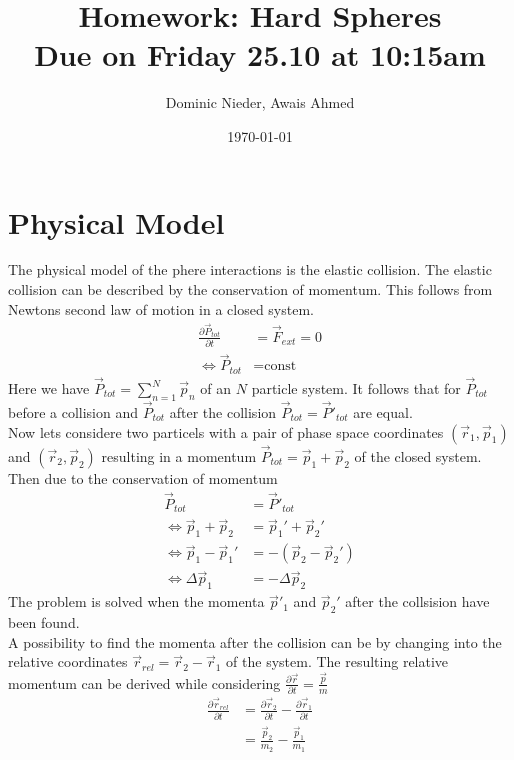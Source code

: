 \documentclass{article}
\title{
    \vspace{2in}
    \textmd{\textbf{Homework: Hard Spheres}}\\
    \normalsize\vspace{0.1in}\small{Due on Friday 25.10 at 10:15am}\\
    \vspace{0.1in}
    \vspace{3in}
}
\author{Dominic Nieder, Awais Ahmed}
\date{\today}
\begin{document}
\maketitle

\newpage

\section{Physical Model}
    The physical model of the phere interactions is the elastic collision. The elastic collision can be described by the conservation of momentum. This follows from Newtons second law of motion in a closed system.
    \begin{align*}
        \frac{\partial \vec{P}_{tot}}{\partial t} &= \vec{F}_{ext}=0  \\
        \Leftrightarrow \vec{P}_{tot}&=\text{const} 
    \end{align*}
    Here we have $\vec{P}_{tot}=\sum_{n=1}^{N}\vec{p}_n$ of an $N$ particle system. It follows that for $\vec{P}_{tot}$ before a collision and $\vec{P}_{tot}$ after the collision $\vec{P}_{tot}=\vec{P}'_{tot}$ are equal. \\
    Now lets considere two particels with a pair of phase space coordinates $(\vec{r}_1, \vec{p}_1)$ and $(\vec{r}_2, \vec{p}_2)$ resulting in a momentum $\vec{P}_{tot}=\vec{p}_1+\vec{p}_2$ of the closed system. Then due to the conservation of momentum 
    \begin{align*}
        \vec{P}_{tot}&=\vec{P}'_{tot} \\
        \Leftrightarrow \vec{p}_1+\vec{p}_2&= \vec{p}_1'+\vec{p}_2' \\
        \Leftrightarrow \vec{p}_1 - \vec{p}_1' &= - (\vec{p}_2 - \vec{p}_2') \\
        \Leftrightarrow \Delta \vec{p}_1 &= -\Delta\vec{p}_2
    \end{align*}
    The problem is solved when the momenta $\vec{p}'_1$ and $\vec{p}_2'$ after the collsision have been found.\\ %
    A possibility to find the momenta after the collision can be by changing into the relative coordinates $\vec{r}_{rel}=\vec{r}_2-\vec{r}_1$ of the system. 
    The resulting relative momentum can be derived while considering $\frac{\partial \vec{r}}{\partial t}=\frac{\vec{p}}{m}$ 
    \begin{align*}
        \frac{\partial \vec{r}_{rel}}{\partial t}&= \frac{\partial \vec{r}_2}{\partial t}-\frac{\partial \vec{r}_1}{\partial t} \\
        &=\frac{\vec{p}_2}{m_2}-\frac{\vec{p}_1}{m_1} 
    \end{align*}
\end{document}
